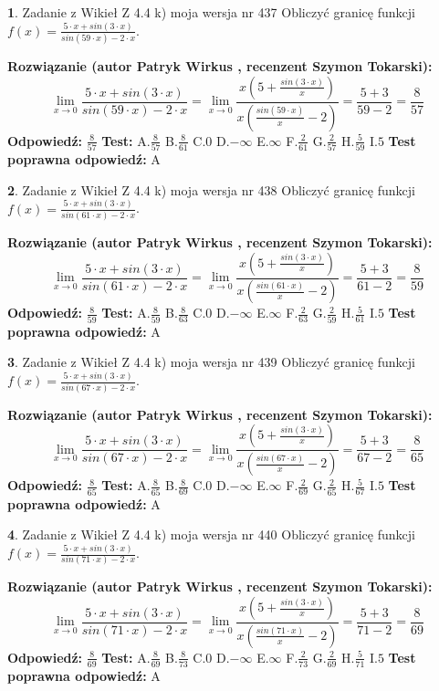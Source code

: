 \documentclass[12pt, a4paper]{article}
\theoremstyle{definition} %
\newtheorem{zad}{}
\newcommand{\zadStart}[1]{\begin{zad}#1\newline}
\newcommand{\zadStop}{\end{zad}}
\newcommand{\rozwStart}[2]{\noindent \textbf{Rozwiązanie (autor #1 , recenzent #2): }\newline}
\newcommand{\rozwStop}{\newline}
\newcommand{\odpStart}{\noindent \textbf{Odpowiedź:}\newline}
\newcommand{\odpStop}{\newline}
\newcommand{\testStart}{\noindent \textbf{Test:}\newline}
\newcommand{\testStop}{\newline}
\newcommand{\kluczStart}{\noindent \textbf{Test poprawna odpowiedź:}\newline}
\newcommand{\kluczStop}{\newline}
\begin{document}
\zadStart{Zadanie z Wikieł Z 4.4 k) moja wersja nr 437}
Obliczyć granicę funkcji $f(x)=\frac{5\cdot x +sin(3\cdot x)}{sin(59\cdot x) -2\cdot x}$.
\zadStop
\rozwStart{Patryk Wirkus}{Szymon Tokarski}
$$\lim\limits_{x\to 0}\frac{5\cdot x +sin(3\cdot x)}{sin(59\cdot x) -2\cdot x}
=\lim\limits_{x\to 0}\frac{x(5+\frac{sin(3\cdot x)}{x})}{x(\frac{sin(59\cdot x)}{x}-2)}
=\frac{5+3}{59-2} = \frac{8}{57}$$
\rozwStop
\odpStart
$\frac{8}{57}$
\odpStop
\testStart
A.$\frac{8}{57}$
B.$\frac{8}{61}$
C.$0$
D.$-\infty$
E.$\infty$
F.$\frac{2}{61}$
G.$\frac{2}{57}$
H.$\frac{5}{59}$
I.$5$
\testStop
\kluczStart
A
\kluczStop



\zadStart{Zadanie z Wikieł Z 4.4 k) moja wersja nr 438}
Obliczyć granicę funkcji $f(x)=\frac{5\cdot x +sin(3\cdot x)}{sin(61\cdot x) -2\cdot x}$.
\zadStop
\rozwStart{Patryk Wirkus}{Szymon Tokarski}
$$\lim\limits_{x\to 0}\frac{5\cdot x +sin(3\cdot x)}{sin(61\cdot x) -2\cdot x}
=\lim\limits_{x\to 0}\frac{x(5+\frac{sin(3\cdot x)}{x})}{x(\frac{sin(61\cdot x)}{x}-2)}
=\frac{5+3}{61-2} = \frac{8}{59}$$
\rozwStop
\odpStart
$\frac{8}{59}$
\odpStop
\testStart
A.$\frac{8}{59}$
B.$\frac{8}{63}$
C.$0$
D.$-\infty$
E.$\infty$
F.$\frac{2}{63}$
G.$\frac{2}{59}$
H.$\frac{5}{61}$
I.$5$
\testStop
\kluczStart
A
\kluczStop



\zadStart{Zadanie z Wikieł Z 4.4 k) moja wersja nr 439}
Obliczyć granicę funkcji $f(x)=\frac{5\cdot x +sin(3\cdot x)}{sin(67\cdot x) -2\cdot x}$.
\zadStop
\rozwStart{Patryk Wirkus}{Szymon Tokarski}
$$\lim\limits_{x\to 0}\frac{5\cdot x +sin(3\cdot x)}{sin(67\cdot x) -2\cdot x}
=\lim\limits_{x\to 0}\frac{x(5+\frac{sin(3\cdot x)}{x})}{x(\frac{sin(67\cdot x)}{x}-2)}
=\frac{5+3}{67-2} = \frac{8}{65}$$
\rozwStop
\odpStart
$\frac{8}{65}$
\odpStop
\testStart
A.$\frac{8}{65}$
B.$\frac{8}{69}$
C.$0$
D.$-\infty$
E.$\infty$
F.$\frac{2}{69}$
G.$\frac{2}{65}$
H.$\frac{5}{67}$
I.$5$
\testStop
\kluczStart
A
\kluczStop



\zadStart{Zadanie z Wikieł Z 4.4 k) moja wersja nr 440}
Obliczyć granicę funkcji $f(x)=\frac{5\cdot x +sin(3\cdot x)}{sin(71\cdot x) -2\cdot x}$.
\zadStop
\rozwStart{Patryk Wirkus}{Szymon Tokarski}
$$\lim\limits_{x\to 0}\frac{5\cdot x +sin(3\cdot x)}{sin(71\cdot x) -2\cdot x}
=\lim\limits_{x\to 0}\frac{x(5+\frac{sin(3\cdot x)}{x})}{x(\frac{sin(71\cdot x)}{x}-2)}
=\frac{5+3}{71-2} = \frac{8}{69}$$
\rozwStop
\odpStart
$\frac{8}{69}$
\odpStop
\testStart
A.$\frac{8}{69}$
B.$\frac{8}{73}$
C.$0$
D.$-\infty$
E.$\infty$
F.$\frac{2}{73}$
G.$\frac{2}{69}$
H.$\frac{5}{71}$
I.$5$
\testStop
\kluczStart
A
\kluczStop
\end{document}
